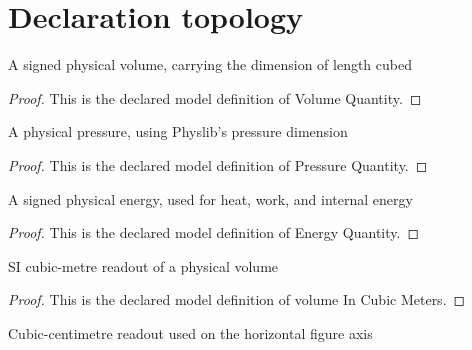 \section{Declaration topology}
\begin{definition}
  \label{def:physics:phyx-mini-0421:phyxminiproblems-problemphyxmini0421-volumequantity}
  A signed physical volume, carrying the dimension of length cubed
\end{definition}
\begin{proof}
  This is the declared model definition of Volume Quantity.
\end{proof}
\begin{definition}
  \label{def:physics:phyx-mini-0421:phyxminiproblems-problemphyxmini0421-pressurequantity}
  A physical pressure, using Physlib's pressure dimension
\end{definition}
\begin{proof}
  This is the declared model definition of Pressure Quantity.
\end{proof}
\begin{definition}
  \label{def:physics:phyx-mini-0421:phyxminiproblems-problemphyxmini0421-energyquantity}
  A signed physical energy, used for heat, work, and internal energy
\end{definition}
\begin{proof}
  This is the declared model definition of Energy Quantity.
\end{proof}
\begin{definition}
  \label{def:physics:phyx-mini-0421:phyxminiproblems-problemphyxmini0421-volumeincubicmeters}
  SI cubic-metre readout of a physical volume
\end{definition}
\begin{proof}
  This is the declared model definition of volume In Cubic Meters.
\end{proof}
\begin{definition}
  \label{def:physics:phyx-mini-0421:phyxminiproblems-problemphyxmini0421-volumeincubiccentimeters}
  Cubic-centimetre readout used on the horizontal figure axis
\end{definition}
